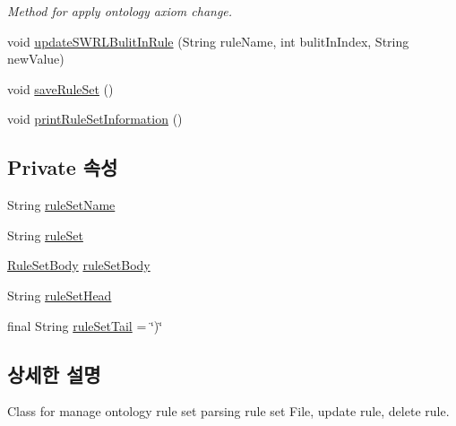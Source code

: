 \begin{DoxyCompactItemize}
\begin{DoxyCompactList}\small\item\em Method for apply ontology axiom change. \end{DoxyCompactList}\item 
void \mbox{\hyperlink{classcom_1_1github_1_1aites_1_1framework_1_1ruleset_1_1_rule_set_manager_ab43e7407d6c856bfd5adbccd71a39b8a}{update\+S\+W\+R\+L\+Bulit\+In\+Rule}} (String rule\+Name, int bulit\+In\+Index, String new\+Value)
\item 
void \mbox{\hyperlink{classcom_1_1github_1_1aites_1_1framework_1_1ruleset_1_1_rule_set_manager_adc237e185bea2444b990ed25875477c9}{save\+Rule\+Set}} ()
\item 
void \mbox{\hyperlink{classcom_1_1github_1_1aites_1_1framework_1_1ruleset_1_1_rule_set_manager_a5d1463747adac54f4fd1285e476a7344}{print\+Rule\+Set\+Information}} ()
\end{DoxyCompactItemize}
\subsection*{Private 속성}
\begin{DoxyCompactItemize}
\item 
String \mbox{\hyperlink{classcom_1_1github_1_1aites_1_1framework_1_1ruleset_1_1_rule_set_manager_aeb9d61ae7f558514e41f5ed18b00a56e}{rule\+Set\+Name}}
\item 
String \mbox{\hyperlink{classcom_1_1github_1_1aites_1_1framework_1_1ruleset_1_1_rule_set_manager_a91929018d0cdd9df1eed93f8f07cb77e}{rule\+Set}}
\item 
\mbox{\hyperlink{classcom_1_1github_1_1aites_1_1framework_1_1ruleset_1_1_rule_set_body}{Rule\+Set\+Body}} \mbox{\hyperlink{classcom_1_1github_1_1aites_1_1framework_1_1ruleset_1_1_rule_set_manager_a2218521e8abc1048bd369c7ed1c14c60}{rule\+Set\+Body}}
\item 
String \mbox{\hyperlink{classcom_1_1github_1_1aites_1_1framework_1_1ruleset_1_1_rule_set_manager_ae9d272c4520c18f269ac835e83be526f}{rule\+Set\+Head}}
\item 
final String \mbox{\hyperlink{classcom_1_1github_1_1aites_1_1framework_1_1ruleset_1_1_rule_set_manager_a6696dfa261a4ccc23236373f8d33b316}{rule\+Set\+Tail}} = \char`\"{})\char`\"{}
\end{DoxyCompactItemize}


\subsection{상세한 설명}
Class for manage ontology rule set parsing rule set File, update rule, delete rule. 

